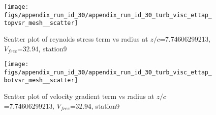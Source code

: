 \begin{figure}[H]
\centering
\texttt{[image: figs/appendix\_run\_id\_30/appendix\_run\_id\_30\_turb\_visc\_ettap\_topvsr\_mesh\_\_scatter]}
\caption{Scatter plot of reynolds stress term vs radius at $z/c$=7.74606299213, $V_{free}$=32.94, station9}
\label{fig:appendix_run_id_30_turb_visc_ettap_topvsr_mesh__scatter}
\end{figure}


\begin{figure}[H]
\centering
\texttt{[image: figs/appendix\_run\_id\_30/appendix\_run\_id\_30\_turb\_visc\_ettap\_botvsr\_mesh\_\_scatter]}
\caption{Scatter plot of velocity gradient term vs radius at $z/c$=7.74606299213, $V_{free}$=32.94, station9}
\label{fig:appendix_run_id_30_turb_visc_ettap_botvsr_mesh__scatter}
\end{figure}


